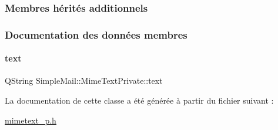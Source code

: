 \subsubsection*{Membres hérités additionnels}


\subsubsection{Documentation des données membres}
\mbox{\label{class_simple_mail_1_1_mime_text_private_a0df65c3c8ea26418893245c22394dc7f}} 
\paragraph{\texorpdfstring{text}{text}}
{\footnotesize\ttfamily Q\+String Simple\+Mail\+::\+Mime\+Text\+Private\+::text}



La documentation de cette classe a été générée à partir du fichier suivant \+:\begin{DoxyCompactItemize}
\item 
\hyperlink{mimetext__p_8h}{mimetext\+\_\+p.\+h}\end{DoxyCompactItemize}
